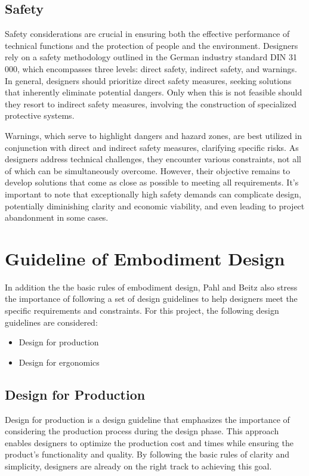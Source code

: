 \subsection{Safety}
Safety \cite{Pahl07y} considerations are crucial in ensuring both the effective performance of technical functions and the protection of people and the environment. Designers rely on a safety methodology outlined in the German industry standard DIN 31 000, which encompasses three levels: direct safety, indirect safety, and warnings. In general, designers should prioritize direct safety measures, seeking solutions that inherently eliminate potential dangers. Only when this is not feasible should they resort to indirect safety measures, involving the construction of specialized protective systems.

Warnings, which serve to highlight dangers and hazard zones, are best utilized in conjunction with direct and indirect safety measures, clarifying specific risks. As designers address technical challenges, they encounter various constraints, not all of which can be simultaneously overcome. However, their objective remains to develop solutions that come as close as possible to meeting all requirements. It's important to note that exceptionally high safety demands can complicate design, potentially diminishing clarity and economic viability, and even leading to project abandonment in some cases.

\section{Guideline of Embodiment Design}
In addition the the basic rules of embodiment design, Pahl and Beitz \cite{Pahl07z} also stress the importance of following a set of design guidelines to help designers meet the specific requirements and constraints. For this project, the following design guidelines are considered:

\begin{itemize}
    \item Design for production
    \item Design for ergonomics
\end{itemize}

\subsection{Design for Production}
Design for production \cite{Pahl07aa} is a design guideline that emphasizes the importance of considering the production process during the design phase. This approach enables designers to optimize the production cost and times while ensuring the product's functionality and quality. By following the basic rules of clarity and simplicity, designers are already on the right track to achieving this goal.

